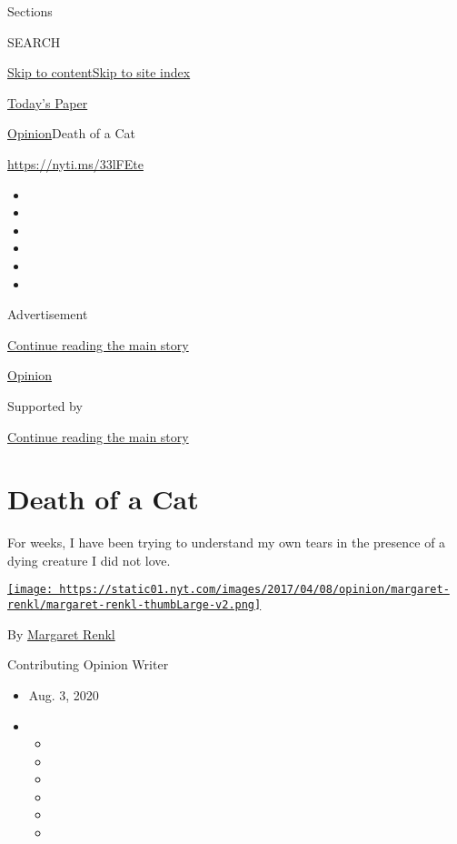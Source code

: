 Sections

SEARCH

\protect\hyperlink{site-content}{Skip to
content}\protect\hyperlink{site-index}{Skip to site index}

\href{https://myaccount.nytimes.com/auth/login?response_type=cookie\&client_id=vi}{}

\href{https://www.nytimes.com/section/todayspaper}{Today's Paper}

\href{/section/opinion}{Opinion}\textbar{}Death of a Cat

\href{https://nyti.ms/33lFEte}{https://nyti.ms/33lFEte}

\begin{itemize}
\item
\item
\item
\item
\item
\item
\end{itemize}

Advertisement

\protect\hyperlink{after-top}{Continue reading the main story}

\href{/section/opinion}{Opinion}

Supported by

\protect\hyperlink{after-sponsor}{Continue reading the main story}

\hypertarget{death-of-a-cat}{%
\section{Death of a Cat}\label{death-of-a-cat}}

For weeks, I have been trying to understand my own tears in the presence
of a dying creature I did not love.

\href{https://www.nytimes.com/by/margaret-renkl}{\texttt{[image: https://static01.nyt.com/images/2017/04/08/opinion/margaret-renkl/margaret-renkl-thumbLarge-v2.png]}}

By \href{https://www.nytimes.com/by/margaret-renkl}{Margaret Renkl}

Contributing Opinion Writer

\begin{itemize}
\item
  Aug. 3, 2020
\item
  \begin{itemize}
  \item
  \item
  \item
  \item
  \item
  \item
  \end{itemize}
\end{itemize}

